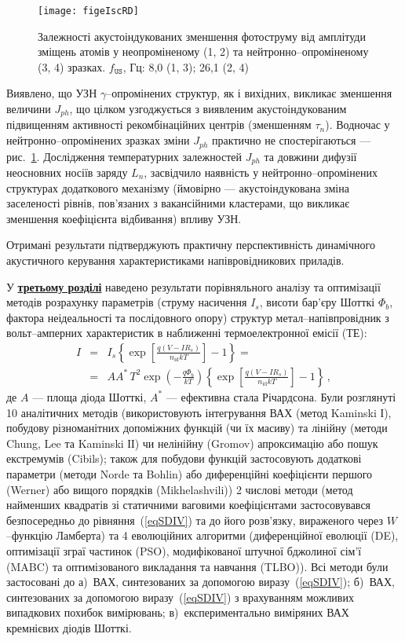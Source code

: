 \begin{figure}[ht]
\center
\texttt{[image: figeIscRD]}
\caption{\label{figeIscRD}
Залежності акустоіндукованих зменшення фотоструму від
амплітуди зміщень атомів у неопроміненому (1, 2)
та нейтронно--опроміненому (3, 4) зразках.
$f_\mathtt{US}$, Гц: 8,0 (1, 3);
26,1 (2, 4)
}%
\end{figure}
Виявлено, що УЗН $\gamma$--опромінених структур, як і вихідних, викликає зменшення величини $J_{ph}$, що цілком
узгоджується з виявленим акустоіндукованим підвищенням активності рекомбінаційних центрів (зменшенням $\tau_n$).
Водночас у нейтронно--опромінених зразках зміни $J_{ph}$ практично не спостерігаються --- рис.~\ref{figeIscRD}.
Дослідження температурних залежностей $J_{ph}$ та довжини дифузії неосновних носіїв заряду $L_n$,
засвідчило наявність у нейтронно--опромінених структурах додаткового механізму (ймовірно --- акустоіндукована зміна заселеності рівнів, пов'язаних з вакансійними кластерами, що викликає зменшення коефіцієнта відбивання) впливу УЗН.

Отримані   результати  підтверджують  практичну перспективність динамічного акустичного керування характеристиками напівровідникових приладів.


У  \underline{\textbf{третьому розділі}} наведено результати порівняльного аналізу та оптимізації методів розрахунку параметрів (струму насичення  $I_s$, висоти бар'єру Шотткі  $\Phi_b$, фактора неідеальності та послідовного опору) структур метал--напівпровідник з вольт--амперних характеристик в наближенні термоелектронної емісії (ТЕ):
\begin{eqnarray}
\label{eqSDIV}
\nonumber I&=&I_s\left\{\exp\left[\frac{q(V-IR_s)}{n_\mathrm{id}kT}\right]-1\right\}=\\
&=&AA^*\,T^2\exp\left(-\frac{q\Phi_b}{kT}\right)\left\{\exp\left[\frac{q(V-IR_s)}{n_\mathrm{id}kT}\right]-1\right\}\,,
\end{eqnarray}
де
$A$ --- площа діода Шотткі,
$A^*$ --- ефективна стала Річардсона.
Були розглянуті 10 аналітичних методів (використовують інтегрування ВАХ (метод Kaminski І), побудову різноманітних допоміжних функцій (чи їх масиву) та лінійну (методи Chung, Lee та Kaminski ІІ) чи нелінійну (Gromov) апроксимацію або пошук екстремумів (Cibils);
також для побудови функцій застосовують додаткові параметри (методи Norde та Bohlin) або диференційні коефіцієнти першого (Werner) або вищого порядків (Mikhelashvili))
2 числові методи (метод найменших квадратів зі статичними ваговими коефіцієнтами застосовувався безпосередньо до рівняння~(\ref{eqSDIV}) та до його розв'язку, вираженого через $W$--функцію Ламберта) та
4 еволюційних алгоритми (диференційної еволюції (DE),
оптимізації зграї частинок (PSO),
модифікованої штучної бджолиної сім'ї (MABC) та
оптимізованого викладання та навчання (TLBO)).
Всі методи були застосовані до
а)~ВАХ, синтезованих за допомогою виразу~(\ref{eqSDIV});
б)~ВАХ, синтезованих за допомогою виразу~(\ref{eqSDIV}) з врахуванням можливих випадкових похибок вимірювань;
в)~експериментально виміряних ВАХ кремнієвих діодів Шотткі.

